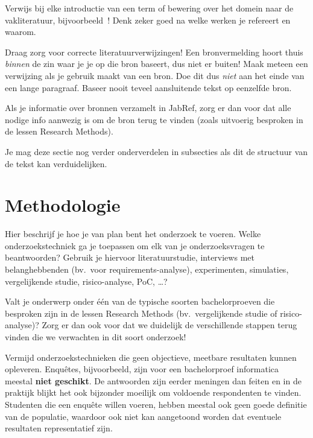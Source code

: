 Verwijs bij elke introductie van een term of bewering over het domein naar de vakliteratuur, bijvoorbeeld~\autocite{Hykes2013}! Denk zeker goed na welke werken je refereert en waarom.

Draag zorg voor correcte literatuurverwijzingen! Een bronvermelding hoort thuis \emph{binnen} de zin waar je je op die bron baseert, dus niet er buiten! Maak meteen een verwijzing als je gebruik maakt van een bron. Doe dit dus \emph{niet} aan het einde van een lange paragraaf. Baseer nooit teveel aansluitende tekst op eenzelfde bron.

Als je informatie over bronnen verzamelt in JabRef, zorg er dan voor dat alle nodige info aanwezig is om de bron terug te vinden (zoals uitvoerig besproken in de lessen Research Methods).


Je mag deze sectie nog verder onderverdelen in subsecties als dit de structuur van de tekst kan verduidelijken.

\section{Methodologie}%
\label{sec:methodologie}

Hier beschrijf je hoe je van plan bent het onderzoek te voeren. Welke onderzoekstechniek ga je toepassen om elk van je onderzoeksvragen te beantwoorden? Gebruik je hiervoor literatuurstudie, interviews met belanghebbenden (bv.~voor requirements-analyse), experimenten, simulaties, vergelijkende studie, risico-analyse, PoC, \ldots?

Valt je onderwerp onder één van de typische soorten bachelorproeven die besproken zijn in de lessen Research Methods (bv.\ vergelijkende studie of risico-analyse)? Zorg er dan ook voor dat we duidelijk de verschillende stappen terug vinden die we verwachten in dit soort onderzoek!

Vermijd onderzoekstechnieken die geen objectieve, meetbare resultaten kunnen opleveren. Enquêtes, bijvoorbeeld, zijn voor een bachelorproef informatica meestal \textbf{niet geschikt}. De antwoorden zijn eerder meningen dan feiten en in de praktijk blijkt het ook bijzonder moeilijk om voldoende respondenten te vinden. Studenten die een enquête willen voeren, hebben meestal ook geen goede definitie van de populatie, waardoor ook niet kan aangetoond worden dat eventuele resultaten representatief zijn.

